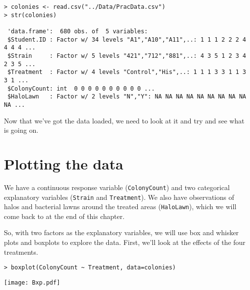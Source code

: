 \begin{lstlisting}
> colonies <- read.csv("../Data/PracData.csv")
> str(colonies)

 'data.frame':	680 obs. of  5 variables:
 $Student.ID : Factor w/ 34 levels "A1","A10","A11",..: 1 1 1 2 2 2 4 4 4 4 ...
 $Strain     : Factor w/ 5 levels "421","712","881",..: 4 3 5 1 2 3 4 2 3 5 ...
 $Treatment  : Factor w/ 4 levels "Control","His",..: 1 1 1 3 3 1 1 3 3 1 ...
 $ColonyCount: int  0 0 0 0 0 0 0 0 0 0 ...
 $HaloLawn   : Factor w/ 2 levels "N","Y": NA NA NA NA NA NA NA NA NA NA ...
\end{lstlisting}

Now that we've got the data loaded, we need to look at it and try and 
see what is going on.

\section{Plotting the data}

We have a continuous response variable ({\tt ColonyCount}) and two 
categorical explanatory variables ({\tt Strain} and {\tt Treatment}). 
We also have observations of halos and bacterial lawns around the 
treated areas ({\tt HaloLawn}), which we will come back to at the end 
of this chapter.

So, with two factors as the explanatory variables, we will use box and 
whisker plots and boxplots to explore the data. First, we'll look at 
the effects of the four treatments.

\begin{lstlisting}
> boxplot(ColonyCount ~ Treatment, data=colonies)
\end{lstlisting}
	
\begin{center}
	\texttt{[image: Bxp.pdf]}
\end{center}  


